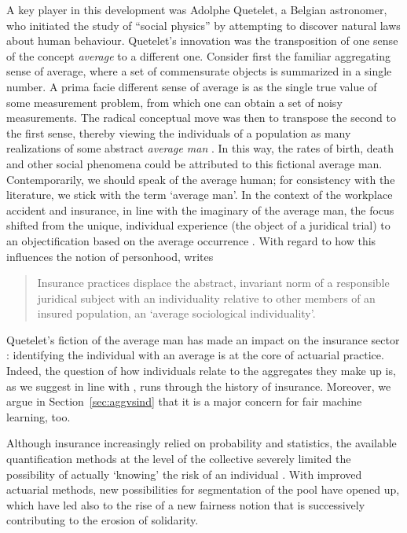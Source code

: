 \documentclass[11pt]{article} %
\begin{document}
A key player in this development was Adolphe Quetelet, a Belgian astronomer, who initiated the study of ``social physics'' by attempting to discover natural laws about human behaviour.
Quetelet's innovation was the transposition of one sense of the concept \textit{average} to a different one. Consider first the familiar aggregating sense of average, where a set of commensurate objects is summarized in a single number. A prima facie different sense of average is as the single true value of some measurement problem, from which one can obtain a set of noisy measurements. The radical conceptual move was then to transpose the second to the first sense, thereby viewing the individuals of a population as many realizations of some abstract \textit{average man} \citep{ewald1990norms,mcfall2011good}. In this way, the rates of birth, death and other social phenomena could be attributed to this fictional average man. Contemporarily, we should speak of the average human; for consistency with the literature, we stick with the term `average man'. In the context of the workplace accident and insurance, in line with the imaginary of the average man, the focus shifted from the unique, individual experience (the object of a juridical trial) to an objectification based on the average occurrence \citep{krippner2023unmasked}. With regard to how this influences the notion of personhood, \citet{dean1998risk} writes
\begin{quote}
    Insurance practices displace the abstract, invariant norm of a responsible juridical subject with an individuality relative to other members of an insured population, an `average sociological individuality'.
\end{quote}
Quetelet's fiction of the average man has made an impact on the insurance sector \citep{mcfall2011good}: identifying the individual with an average is at the core of actuarial practice.
Indeed, the question of how individuals relate to the aggregates they make up is, as we suggest in line with \citet{krippner2023unmasked}, runs through the history of insurance. Moreover, we argue in Section~\ref{sec:aggvsind} that it is a major concern for fair machine learning, too.

Although insurance increasingly relied on probability and statistics, the available quantification methods at the level of the collective severely limited the possibility of actually `knowing' the risk of an individual \citep{barry2019rationality}. With improved actuarial methods, new possibilities for segmentation of the pool have opened up, which have led also to the rise of a new fairness notion that is successively contributing to the erosion of solidarity.
\end{document}
